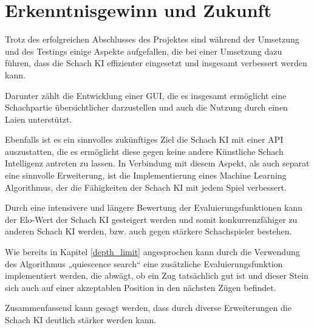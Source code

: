 \section{Erkenntnisgewinn und Zukunft}
Trotz des erfolgreichen Abschlusses des Projektes sind während der Umsetzung und des Testings einige Aspekte aufgefallen, die bei einer Umsetzung dazu führen, dass die Schach KI effizienter eingesetzt und insgesamt verbessert werden kann.

Darunter zählt die Entwicklung einer GUI, die es insgesamt ermöglicht eine Schachpartie übersichtlicher darzustellen und auch die Nutzung durch einen Laien unterstützt.

Ebenfalls ist es ein sinnvolles zukünftiges Ziel die Schach KI mit einer API auszustatten, die es ermöglicht diese gegen keine andere Künstliche Schach Intelligenz antreten zu lassen. In Verbindung mit diesem Aspekt, als auch separat eine sinnvolle Erweiterung, ist die Implementierung eines Machine Learning Algorithmus, der die Fähigkeiten der Schach KI mit jedem Spiel verbessert.

Durch eine intensivere und längere Bewertung der Evaluierungsfunktionen kann der Elo-Wert der Schach KI gesteigert werden und somit konkurrenzfähiger zu anderen Schach KI werden, bzw. auch gegen stärkere Schachspieler bestehen.

Wie bereits in Kapitel \ref{depth_limit} angesprochen kann durch die Verwendung des Algorithmus „quiescence search“ eine zusätzliche Evaluierungsfunktion implementiert werden, die abwägt, ob ein Zug tatsächlich gut ist und dieser Stein sich auch auf einer akzeptablen Position in den nächsten Zügen befindet.

Zusammenfassend kann gesagt werden, dass durch diverse Erweiterungen die Schach KI deutlich stärker werden kann.